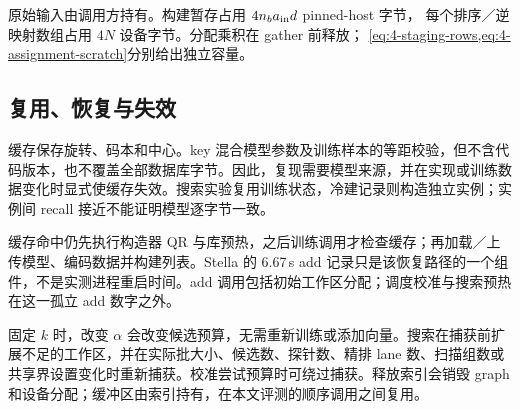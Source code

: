 原始输入由调用方持有。构建暂存占用 $4n_ba_{\rm in}d$ pinned-host 字节，
每个排序／逆映射数组占用 $4N$ 设备字节。分配乘积在 gather 前释放；
\cref{eq:4-staging-rows,eq:4-assignment-scratch}分别给出独立容量。


\subsection{复用、恢复与失效}

缓存保存旋转、码本和中心。key 混合模型参数及训练样本的等距校验，但不含代码版本，也不覆盖全部数据库字节。因此，复现需要模型来源，并在实现或训练数据变化时显式使缓存失效。搜索实验复用训练状态，冷建记录则构造独立实例；实例间 recall 接近不能证明模型逐字节一致。

缓存命中仍先执行构造器 QR 与库预热，之后训练调用才检查缓存；再加载／上传模型、编码数据并构建列表。Stella 的 6.67\,s add 记录只是该恢复路径的一个组件，不是实测进程重启时间。add 调用包括初始工作区分配；调度校准与搜索预热在这一孤立 add 数字之外。

固定 $k$ 时，改变 $\alpha$ 会改变候选预算，无需重新训练或添加向量。搜索在捕获前扩展不足的工作区，并在实际批大小、候选数、探针数、精排 lane 数、扫描组数或共享界设置变化时重新捕获。校准尝试预算时可绕过捕获。释放索引会销毁 graph 和设备分配；缓冲区由索引持有，在本文评测的顺序调用之间复用。
